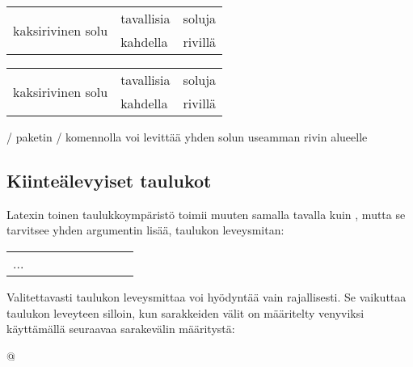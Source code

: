 \begin{esimerkki*}
  \komentoi{\keno}

\begin{koodilohko}
\begin{tabular}{|l|l|l|}
  \hline
  \multirow{2}{*}{kaksirivinen solu} & tavallisia & soluja \\
  \cline{2-3}
                                     & kahdella   & rivillä \\
  \hline
\end{tabular}
\end{koodilohko}

  \begin{tulos}
    \renewcommand{\arraystretch}{1.3}
    \begin{tabular}{|l|l|l|}
      \hline
      \multirow{2}{*}[-1bp]{kaksirivinen solu} & tavallisia & soluja \\
      \cline{2-3}
                                               & kahdella & rivillä \\
      \hline
    \end{tabular}
  \end{tulos}

  \caption{\-/ paketin \-/
    komennolla voi levittää yhden solun useamman rivin alueelle}
  \label{esim/taulukko-multirow}
\end{esimerkki*}

\subsection{Kiinteälevyiset taulukot}

Latexin toinen taulukkoympäristö  toimii muuten
samalla tavalla kuin , mutta se tarvitsee yhden
argumentin lisää, taulukon leveysmitan:

\begin{koodilohkosis}
\begin{tabular*}{leveys}[sijainti]{sarakkeet}
  ...
\end{tabular*}
\end{koodilohkosis}

Valitettavasti taulukon leveysmittaa voi hyödyntää vain rajallisesti. Se
vaikuttaa taulukon leveyteen silloin, kun sarakkeiden välit on
määritelty venyviksi käyttämällä seuraavaa sarakevälin määritystä:

\begin{koodilohkosis}
@{\extracolsep{\fill}}
\end{koodilohkosis}

